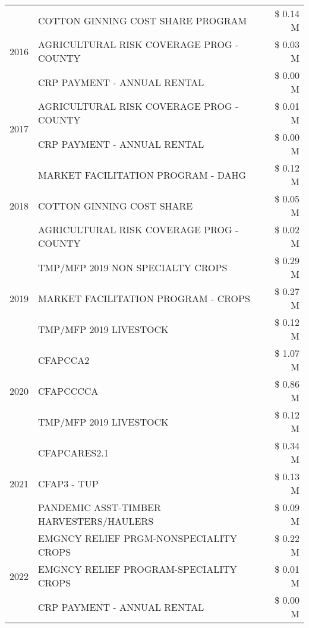 \begin{tabular}{llr}
\cline{1-3}
\multirow[t]{3}{*}{2016} & COTTON GINNING COST SHARE PROGRAM & \$ 0.14 M \\
 & AGRICULTURAL RISK COVERAGE PROG - COUNTY & \$ 0.03 M \\
 & CRP PAYMENT - ANNUAL RENTAL & \$ 0.00 M \\
\cline{1-3}
\multirow[t]{2}{*}{2017} & AGRICULTURAL RISK COVERAGE PROG - COUNTY & \$ 0.01 M \\
 & CRP PAYMENT - ANNUAL RENTAL & \$ 0.00 M \\
\cline{1-3}
\multirow[t]{3}{*}{2018} & MARKET FACILITATION PROGRAM - DAHG & \$ 0.12 M \\
 & COTTON GINNING COST SHARE & \$ 0.05 M \\
 & AGRICULTURAL RISK COVERAGE PROG - COUNTY & \$ 0.02 M \\
\cline{1-3}
\multirow[t]{3}{*}{2019} & TMP/MFP 2019 NON SPECIALTY CROPS & \$ 0.29 M \\
 & MARKET FACILITATION PROGRAM - CROPS & \$ 0.27 M \\
 & TMP/MFP 2019 LIVESTOCK & \$ 0.12 M \\
\cline{1-3}
\multirow[t]{3}{*}{2020} & CFAPCCA2 & \$ 1.07 M \\
 & CFAPCCCCA & \$ 0.86 M \\
 & TMP/MFP 2019 LIVESTOCK & \$ 0.12 M \\
\cline{1-3}
\multirow[t]{3}{*}{2021} & CFAPCARES2.1 & \$ 0.34 M \\
 & CFAP3 - TUP & \$ 0.13 M \\
 & PANDEMIC ASST-TIMBER HARVESTERS/HAULERS & \$ 0.09 M \\
\cline{1-3}
\multirow[t]{3}{*}{2022} & EMGNCY RELIEF PRGM-NONSPECIALITY CROPS & \$ 0.22 M \\
 & EMGNCY RELIEF PROGRAM-SPECIALITY CROPS & \$ 0.01 M \\
 & CRP PAYMENT - ANNUAL RENTAL & \$ 0.00 M \\
\cline{1-3}
\bottomrule
\end{tabular}
